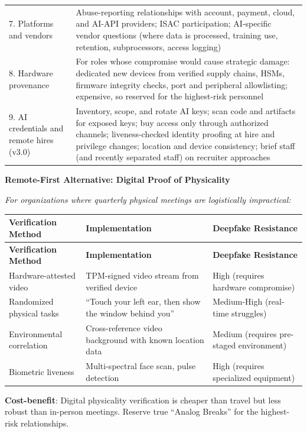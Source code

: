 \documentclass[11pt,letterpaper]{article}
\newcommand{\etraneed}[1]{\par\ifdim\pagegoal<\maxdimen\ifdim\pagetotal<\pagegoal\ifdim\dimexpr\pagegoal-\pagetotal\relax<\dimexpr#1\relax\newpage\fi\fi\fi}
\begin{document}
{\begin{longtable}{L{3.6cm}L{9.2cm}}
7. Platforms and vendors & Abuse-reporting relationships with account, payment, cloud, and AI-API providers; ISAC participation; AI-specific vendor questions (where data is processed, training use, retention, subprocessors, access logging) \\
8. Hardware provenance & For roles whose compromise would cause strategic damage: dedicated new devices from verified supply chains, HSMs, firmware integrity checks, port and peripheral allowlisting; expensive, so reserved for the highest-risk personnel \\*
9. AI credentials and remote hires (v3.0) & Inventory, scope, and rotate AI keys; scan code and artifacts for exposed keys; buy access only through authorized channels; liveness-checked identity proofing at hire and privilege changes; location and device consistency; brief staff (and recently separated staff) on recruiter approaches \\
\bottomrule
\end{longtable}}

\etraneed{11\baselineskip}
\textbf{Remote-First Alternative: Digital Proof of Physicality}

\textit{For organizations where quarterly physical meetings are logistically impractical:}

{\small
\begin{longtable}{L{4cm}L{5cm}L{3.5cm}}
\toprule
\textbf{Verification Method} & \textbf{Implementation} & \textbf{Deepfake Resistance} \\
\midrule
\endfirsthead
\toprule
\textbf{Verification Method} & \textbf{Implementation} & \textbf{Deepfake Resistance} \\
\midrule
\endhead
Hardware-attested video & TPM-signed video stream from verified device & High (requires hardware compromise) \\*
Randomized physical tasks & ``Touch your left ear, then show the window behind you'' & Medium-High (real-time struggles) \\
Environmental correlation & Cross-reference video background with known location data & Medium (requires pre-staged environment) \\*
Biometric liveness & Multi-spectral face scan, pulse detection & High (requires specialized equipment) \\
\bottomrule
\end{longtable}}

\textbf{Cost-benefit}: Digital physicality verification is cheaper than travel but less robust than in-person meetings. Reserve true ``Analog Breaks'' for the highest-risk relationships.
\end{document}
